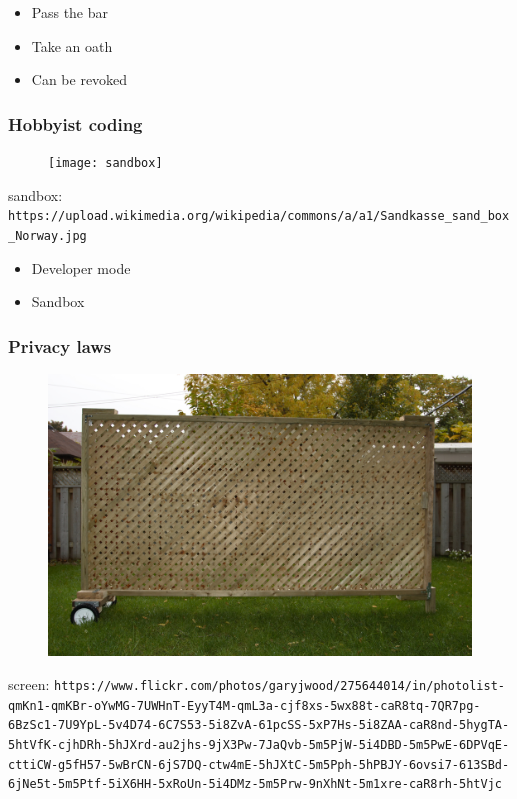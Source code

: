 \begin{itemize}
\item Pass the bar
\item Take an oath
\item Can be revoked
\end{itemize}

\begin{frame}[fragile]
\frametitle{Hobbyist coding}

\begin{figure}
\texttt{[image: sandbox]}
\end{figure}

\end{frame}

sandbox: \verb|https://upload.wikimedia.org/wikipedia/commons/a/a1/Sandkasse_sand_box_Norway.jpg|

\begin{itemize}
\item Developer mode
\item Sandbox
\end{itemize}



\begin{frame}[fragile]
\frametitle{Privacy laws}

\begin{figure}
\includegraphics[scale=0.3]{screen}
\end{figure}

\end{frame}

screen: \verb|https://www.flickr.com/photos/garyjwood/275644014/in/photolist-qmKn1-qmKBr-oYwMG-7UWHnT-EyyT4M-qmL3a-cjf8xs-5wx88t-caR8tq-7QR7pg-6BzSc1-7U9YpL-5v4D74-6C7S53-5i8ZvA-61pcSS-5xP7Hs-5i8ZAA-caR8nd-5hygTA-5htVfK-cjhDRh-5hJXrd-au2jhs-9jX3Pw-7JaQvb-5m5PjW-5i4DBD-5m5PwE-6DPVqE-cttiCW-g5fH57-5wBrCN-6jS7DQ-ctw4mE-5hJXtC-5m5Pph-5hPBJY-6ovsi7-613SBd-6jNe5t-5m5Ptf-5iX6HH-5xRoUn-5i4DMz-5m5Prw-9nXhNt-5m1xre-caR8rh-5htVjc|

